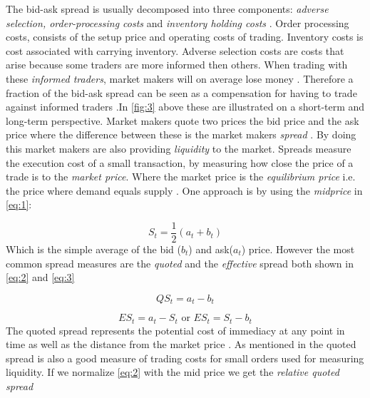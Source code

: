 \documentclass{kththesis}
\theoremstyle{definition}
\begin{document}
The bid-ask spread is usually decomposed into three components: \textit{adverse selection, order-processing costs} and \textit{inventory holding costs} \parencite{foucault2013market}. Order processing costs, consists of the setup price and operating costs of trading. Inventory costs is cost associated with carrying inventory. Adverse selection costs are costs that arise because some traders are more informed then others. When trading with these \textit{informed traders}, market makers will on average lose money \parencite{darley2007nasdaq}. Therefore a fraction of the bid-ask spread can be seen as a compensation for having to trade against informed traders \parencite{darley2007nasdaq}.In \autoref{fig:3} above these are illustrated on a short-term and long-term perspective.
\newline
\newline
Market makers quote two prices the bid price and the ask price where the difference between these is the market makers \textit{spread} \parencite{madhavan2000market}. By doing this market makers are also providing \textit{liquidity} to the market. Spreads measure the execution cost of a small transaction, by measuring how close the price of a trade is to the \textit{market price}. Where the market price is the \textit{equilibrium price} i.e. the price where demand equals supply \parencite{cartea2015algorithmic}. One approach is by using the \textit{midprice} in \autoref{eq:1}:

\begin{equation}
    \label{eq:1}
    S_{t} = \frac{1}{2}(a_t + b_t)
\end{equation}
Which is the simple average of the bid ($b_t$) and ask($a_t$) price.
However the most common spread measures are the \textit{quoted} and the \textit{effective} \parencite{cartea2015algorithmic, foucault2013market} spread both shown in \autoref{eq:2} and \autoref{eq:3}

\begin{equation}
    \label{eq:2}
    QS_t = a_t - b_t
\end{equation}

\begin{equation}
    \label{eq:3}
    ES_t = a_t - S_t \text{ or } ES_t = S_t - b_t
\end{equation}
The quoted spread represents the potential cost of immediacy at any point in time as well as the distance from the market price \parencite{cartea2015algorithmic}. As mentioned in \textcite{foucault2013market} the quoted spread is also a good measure of trading costs for small orders used for measuring liquidity. If we normalize \autoref{eq:2} with the mid price we get the \textit{relative quoted spread} 
\end{document}
